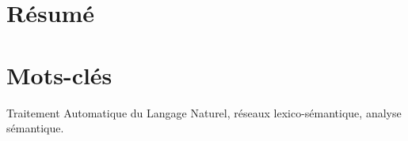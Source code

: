 \section*{Résumé}
\label{sec:resume}


\begin{todo}

\end{todo}

\section*{Mots-clés}
\label{sec:motsCles}

Traitement Automatique du Langage Naturel, réseaux lexico-sémantique, analyse
sémantique.